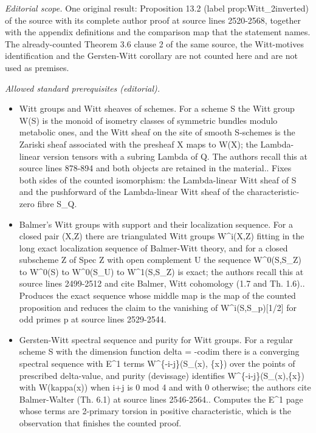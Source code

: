 \documentclass[10pt,a4paper]{amsart}
\theoremstyle{remark}
\theoremstyle{definition}
\numberwithin{equation}{thm}
\begin{document}
\noindent\textit{Editorial scope.} One original result: Proposition 13.2 (label prop:Witt\_2inverted) of the source with its complete author proof at source lines 2520-2568, together with the appendix definitions and the comparison map that the statement names. The already-counted Theorem 3.6 clause 2 of the same source, the Witt-motives identification and the Gersten-Witt corollary are not counted here and are not used as premises.\par\medskip
\noindent\textit{Allowed standard prerequisites (editorial).}\begin{itemize}
\item Witt groups and Witt sheaves of schemes. For a scheme S the Witt group W(S) is the monoid of isometry classes of symmetric bundles modulo metabolic ones, and the Witt sheaf on the site of smooth S-schemes is the Zariski sheaf associated with the presheaf X maps to W(X); the Lambda-linear version tensors with a subring Lambda of Q. The authors recall this at source lines 878-894 and both objects are retained in the material.. Fixes both sides of the counted isomorphism: the Lambda-linear Witt sheaf of S and the pushforward of the Lambda-linear Witt sheaf of the characteristic-zero fibre S\_Q.
\item Balmer's Witt groups with support and their localization sequence. For a closed pair (X,Z) there are triangulated Witt groups W\textasciicircum{}i(X,Z) fitting in the long exact localization sequence of Balmer-Witt theory, and for a closed subscheme Z of Spec Z with open complement U the sequence W\textasciicircum{}0(S,S\_Z) to W\textasciicircum{}0(S) to W\textasciicircum{}0(S\_U) to W\textasciicircum{}1(S,S\_Z) is exact; the authors recall this at source lines 2499-2512 and cite Balmer, Witt cohomology (1.7 and Th. 1.6).. Produces the exact sequence whose middle map is the map of the counted proposition and reduces the claim to the vanishing of W\textasciicircum{}i(S,S\_p)[1/2] for odd primes p at source lines 2529-2544.
\item Gersten-Witt spectral sequence and purity for Witt groups. For a regular scheme S with the dimension function delta = -codim there is a converging spectral sequence with E\textasciicircum{}1 terms W\textasciicircum{}\{-i-j\}(S\_(x), \{x\}) over the points of prescribed delta-value, and purity (devissage) identifies W\textasciicircum{}\{-i-j\}(S\_(x),\{x\}) with W(kappa(x)) when i+j is 0 mod 4 and with 0 otherwise; the authors cite Balmer-Walter (Th. 6.1) at source lines 2546-2564.. Computes the E\textasciicircum{}1 page whose terms are 2-primary torsion in positive characteristic, which is the observation that finishes the counted proof.
\end{itemize}\medskip
\end{document}
